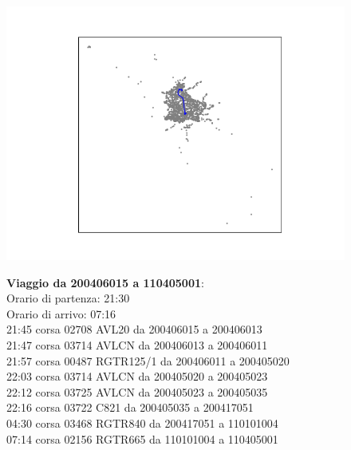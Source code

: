 \documentclass{article}
\begin{document}
\begin{figure}[H]
	\begin{minipage}{0.55\linewidth}
		\centering
		\hspace*{-3cm}\includegraphics[width=1.0\linewidth, valign=t]{figures/200406015_110405001}
	\end{minipage}
	\hspace*{-2cm}\begin{minipage}{0.7\linewidth}
		\textbf{Viaggio da 200406015 a 110405001}:\\
		Orario di partenza: 21:30\\
		Orario di arrivo: 07:16\\
		21:45 corsa 02708 AVL20 da 200406015 a 200406013\\
		21:47 corsa 03714 AVLCN da 200406013 a 200406011\\
		21:57 corsa 00487 RGTR125/1 da 200406011 a 200405020\\
		22:03 corsa 03714 AVLCN da 200405020 a 200405023\\
		22:12 corsa 03725 AVLCN da 200405023 a 200405035\\
		22:16 corsa 03722 C821 da 200405035 a 200417051\\
		04:30 corsa 03468 RGTR840 da 200417051 a 110101004\\
		07:14 corsa 02156 RGTR665 da 110101004 a 110405001
		
\end{minipage}
\end{figure}
\end{document}
